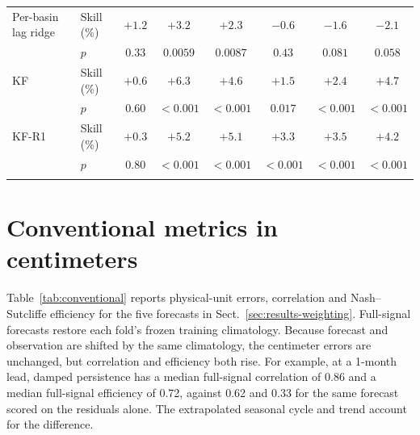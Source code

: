 \documentclass[hess, manuscript]{copernicus}
\begin{document}
\begin{table}[!htbp]
\begin{tabular}{@{}llcccccc@{}}
Per-basin lag ridge & Skill (\%) & $+1.2$ & $+3.2$ & $+2.3$ & $-0.6$ & $-1.6$ & $-2.1$ \\
 & $p$ & $0.33$ & $0.0059$ & $0.0087$ & $0.43$ & $0.081$ & $0.058$ \\
KF & Skill (\%) & $+0.6$ & $+6.3$ & $+4.6$ & $+1.5$ & $+2.4$ & $+4.7$ \\
 & $p$ & $0.60$ & $<0.001$ & $<0.001$ & $0.017$ & $<0.001$ & $<0.001$ \\
KF-R1 & Skill (\%) & $+0.3$ & $+5.2$ & $+5.1$ & $+3.3$ & $+3.5$ & $+4.2$ \\
 & $p$ & $0.80$ & $<0.001$ & $<0.001$ & $<0.001$ & $<0.001$ & $<0.001$ \\
\bottomhline
\end{tabular}
\end{table}

\clearpage
\section{Conventional metrics in centimeters}
\label{app:conventional}

Table~\ref{tab:conventional} reports physical-unit errors, correlation and
Nash--Sutcliffe efficiency for the five forecasts in
Sect.~\ref{sec:results-weighting}. Full-signal forecasts restore each fold's
frozen training climatology. Because forecast and observation are shifted
by the same climatology, the centimeter errors are unchanged, but
correlation and efficiency both rise. For example, at a 1-month lead,
damped persistence has a median full-signal correlation of
0.86 and a median full-signal efficiency of 0.72, against 0.62 and 0.33
for the same forecast scored on the residuals alone. The extrapolated
seasonal cycle and trend account for the difference.
\end{document}
